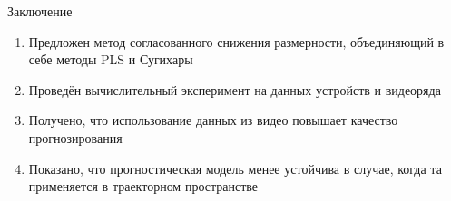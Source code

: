 \documentclass{beamer}
\begin{document}
	\begin{frame}{Заключение}
		\begin{enumerate}
			\item Предложен метод согласованного снижения размерности, объединяющий в себе методы PLS и Сугихары
			
			\item Проведён вычислительный эксперимент на данных устройств и видеоряда
			
			\item Получено, что использование данных из видео повышает качество прогнозирования
			
			\item Показано, что прогностическая модель менее устойчива в случае, когда та применяется в траекторном пространстве
		\end{enumerate}
	\end{frame}
\end{document}
